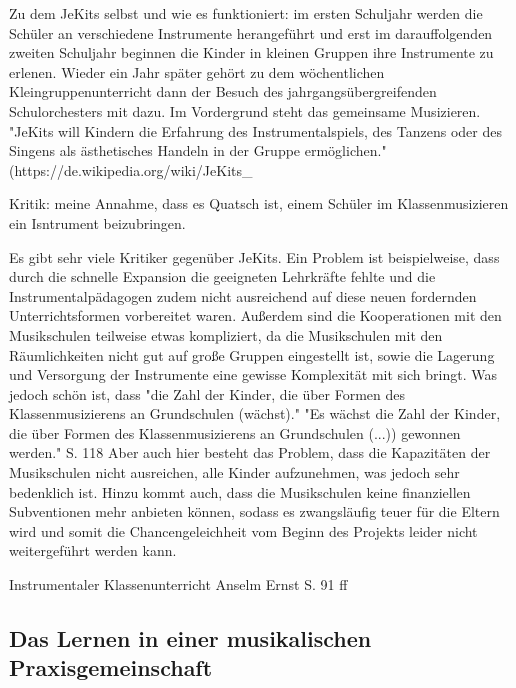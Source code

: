 Zu dem JeKits selbst und wie es funktioniert: im ersten Schuljahr werden die
Schüler an verschiedene Instrumente herangeführt und erst im darauffolgenden
zweiten Schuljahr beginnen die Kinder in kleinen Gruppen ihre Instrumente zu
erlenen. Wieder ein Jahr später gehört zu dem wöchentlichen
Kleingruppenunterricht dann der Besuch des jahrgangsübergreifenden Schulorchesters mit
dazu. Im Vordergrund steht das gemeinsame Musizieren. "JeKits will Kindern die
Erfahrung des Instrumentalspiels, des Tanzens oder des Singens als ästhetisches 
Handeln in der Gruppe ermöglichen." (https://de.wikipedia.org/wiki/JeKits_%



Kritik:
meine Annahme, dass es Quatsch ist, einem Schüler im Klassenmusizieren
ein Isntrument beizubringen.

Es gibt sehr viele Kritiker gegenüber JeKits. Ein Problem ist beispielweise,
dass durch die schnelle Expansion die geeigneten Lehrkräfte fehlte und die
Instrumentalpädagogen zudem nicht ausreichend auf diese neuen fordernden
Unterrichtsformen vorbereitet waren. Außerdem sind die Kooperationen mit den
Musikschulen teilweise etwas kompliziert, da die Musikschulen mit den
Räumlichkeiten nicht gut auf große Gruppen eingestellt ist, sowie die Lagerung
und Versorgung der Instrumente eine gewisse Komplexität mit sich bringt. 
Was jedoch schön ist, dass "die Zahl der Kinder, die über Formen des
Klassenmusizierens an Grundschulen (wächst)." 
"Es wächst die Zahl der Kinder, die über Formen des Klassenmusizierens an
Grundschulen (...)) gewonnen werden." S. 118 
Aber auch hier besteht das Problem, dass die Kapazitäten der Musikschulen nicht
ausreichen, alle Kinder aufzunehmen, was jedoch sehr bedenklich ist. Hinzu kommt
auch, dass die Musikschulen keine finanziellen Subventionen mehr anbieten
können, sodass es zwangsläufig teuer für die Eltern wird und somit die
Chancengeleichheit vom Beginn des Projekts leider nicht weitergeführt werden
kann.

Instrumentaler Klassenunterricht
Anselm Ernst S. 91 ff

\subsection{Das Lernen in einer musikalischen Praxisgemeinschaft}
